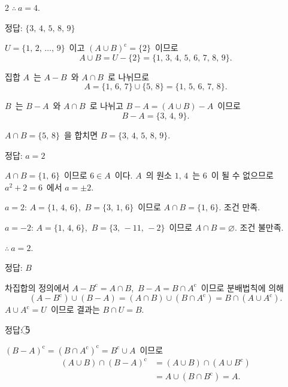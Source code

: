 \documentclass[10pt,fleqn]{article}
\begin{document}
\begin{multicols*}{2}
$\therefore\ a=4$.

\begin{dmanswerbox}
정답: $\{3,\,4,\,5,\,8,\,9\}$
\end{dmanswerbox}

$U=\{1,\,2,\,\ldots,\,9\}$\ 이고 $(A\cup B)^{\mathrm{c}}=\{2\}$\ 이므로
\[ A\cup B=U-\{2\}=\{1,\,3,\,4,\,5,\,6,\,7,\,8,\,9\}. \]

집합 $A$\ 는 $A-B$\ 와 $A\cap B$\ 로 나뉘므로
\[ A=\{1,\,6,\,7\}\cup\{5,\,8\}=\{1,\,5,\,6,\,7,\,8\}. \]

$B$\ 는 $B-A$\ 와 $A\cap B$\ 로 나뉘고 $B-A=(A\cup B)-A$\ 이므로
\[ B-A=\{3,\,4,\,9\}. \]

$A\cap B=\{5,\,8\}$\ 을 합치면 $B=\{3,\,4,\,5,\,8,\,9\}$.

\begin{dmanswerbox}
정답: $a=2$
\end{dmanswerbox}

$A\cap B=\{1,\,6\}$\ 이므로 $6\in A$\ 이다. $A$\ 의 원소 $1,\,4$\ 는 $6$\ 이 될 수 없으므로 $a^{2}+2=6$\ 에서 $a=\pm 2$.

\vspace{2mm}
$a=2$: $A=\{1,\,4,\,6\}$,\ $B=\{3,\,1,\,6\}$\ 이므로 $A\cap B=\{1,\,6\}$. 조건 만족.

$a=-2$: $A=\{1,\,4,\,6\}$,\ $B=\{3,\,-11,\,-2\}$\ 이므로 $A\cap B=\varnothing$. 조건 불만족.

$\therefore\ a=2$.

\begin{dmanswerbox}
정답: $B$
\end{dmanswerbox}

차집합의 정의에서 $A-B^{\mathrm{c}}=A\cap B$,\ $B-A=B\cap A^{\mathrm{c}}$\ 이므로 분배법칙에 의해
\[ (A-B^{\mathrm{c}})\cup(B-A)=(A\cap B)\cup(B\cap A^{\mathrm{c}})=B\cap(A\cup A^{\mathrm{c}}). \]
$A\cup A^{\mathrm{c}}=U$\ 이므로 결과는 $B\cap U=B$.

\begin{dmanswerbox}
정답: \textcircled{\scriptsize 5}
\end{dmanswerbox}

$(B-A)^{\mathrm{c}}=(B\cap A^{\mathrm{c}})^{\mathrm{c}}=B^{\mathrm{c}}\cup A$\ 이므로
\begin{align*}
  (A\cup B)\cap(B-A)^{\mathrm{c}}&=(A\cup B)\cap(A\cup B^{\mathrm{c}}) \\
  &=A\cup(B\cap B^{\mathrm{c}})=A.
\end{align*}


\end{multicols*}
\end{document}
